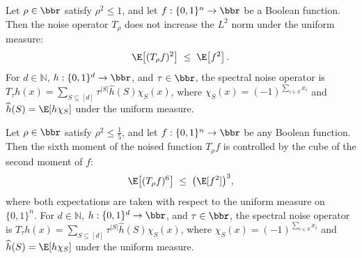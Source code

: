 \begin{theorem}
\leanok
{}
\label{BooleanAnalysis.Hypercontractivity.hypercontractivity_2_2}
Let $\rho\in\bbr$ satisfy $\rho^2\le 1$, and let $f:\{0,1\}^n\to\bbr$ be a Boolean
function. Then the noise operator $T_\rho$ does not increase the $L^2$ norm under the
uniform measure:
\[
  \E\!\left[(T_\rho f)^2\right] \;\le\; \E\!\left[f^2\right].
\] For $d\in\mathbb N$, $h:\{0,1\}^d\to\bbr$, and $\tau\in\bbr$, the spectral noise
operator is $T_\tau h(x)=\sum_{S\subseteq[d]}\tau^{|S|}\widehat h(S)\chi_S(x)$, where
$\chi_S(x)=(-1)^{\sum_{i\in S}x_i}$ and $\widehat h(S)=\E[h\chi_S]$ under the uniform
measure.
\end{theorem}

\begin{theorem}
\leanok
{}
\label{BooleanAnalysis.Hypercontractivity.hypercontractivity_2_6}
Let $\rho\in\bbr$ satisfy $\rho^2\le \tfrac15$, and let $f:\{0,1\}^n\to\bbr$ be any
Boolean function. Then the sixth moment of the noised function $T_\rho f$ is controlled
by the cube of the second moment of $f$:
\[
  \E\bigl[(T_\rho f)^6\bigr] \;\le\; \bigl(\E[f^2]\bigr)^3,
\]
where both expectations are taken with respect to the uniform measure on $\{0,1\}^n$.
For $d\in\mathbb N$, $h:\{0,1\}^d\to\bbr$, and $\tau\in\bbr$, the spectral noise
operator is $T_\tau h(x)=\sum_{S\subseteq[d]}\tau^{|S|}\widehat h(S)\chi_S(x)$, where
$\chi_S(x)=(-1)^{\sum_{i\in S}x_i}$ and $\widehat h(S)=\E[h\chi_S]$ under the uniform
measure.
\end{theorem}

